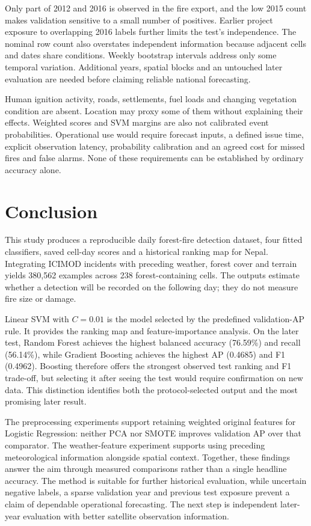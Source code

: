 \documentclass[conference,a4paper]{IEEEtran}
\begin{document}
Only part of 2012 and 2016 is observed in the fire export, and the low 2015 count makes validation sensitive to a small number of positives. Earlier project exposure to overlapping 2016 labels further limits the test's independence. The nominal row count also overstates independent information because adjacent cells and dates share conditions. Weekly bootstrap intervals address only some temporal variation. Additional years, spatial blocks and an untouched later evaluation are needed before claiming reliable national forecasting.

Human ignition activity, roads, settlements, fuel loads and changing vegetation condition are absent. Location may proxy some of them without explaining their effects. Weighted scores and SVM margins are also not calibrated event probabilities. Operational use would require forecast inputs, a defined issue time, explicit observation latency, probability calibration and an agreed cost for missed fires and false alarms. None of these requirements can be established by ordinary accuracy alone.

\section{Conclusion}
This study produces a reproducible daily forest-fire detection dataset, four fitted classifiers, saved cell-day scores and a historical ranking map for Nepal. Integrating ICIMOD incidents with preceding weather, forest cover and terrain yields 380,562 examples across 238 forest-containing cells. The outputs estimate whether a detection will be recorded on the following day; they do not measure fire size or damage.

Linear SVM with $C=0.01$ is the model selected by the predefined validation-AP rule. It provides the ranking map and feature-importance analysis. On the later test, Random Forest achieves the highest balanced accuracy (76.59\%) and recall (56.14\%), while Gradient Boosting achieves the highest AP (0.4685) and F1 (0.4962). Boosting therefore offers the strongest observed test ranking and F1 trade-off, but selecting it after seeing the test would require confirmation on new data. This distinction identifies both the protocol-selected output and the most promising later result.

The preprocessing experiments support retaining weighted original features for Logistic Regression: neither PCA nor SMOTE improves validation AP over that comparator. The weather-feature experiment supports using preceding meteorological information alongside spatial context. Together, these findings answer the aim through measured comparisons rather than a single headline accuracy. The method is suitable for further historical evaluation, while uncertain negative labels, a sparse validation year and previous test exposure prevent a claim of dependable operational forecasting. The next step is independent later-year evaluation with better satellite observation information.
\end{document}
